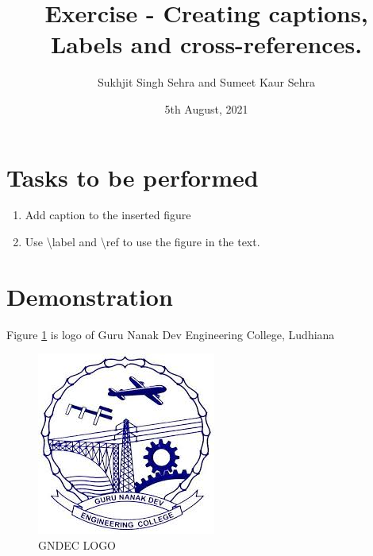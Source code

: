 \documentclass{article}
\title{Exercise - Creating captions, Labels and cross-references.}
\author{Sukhjit Singh Sehra and Sumeet Kaur Sehra}
\date{5th August, 2021}
\begin{document}
	\maketitle	
	\section*{Tasks to be performed}
	\begin{enumerate}	
		\item Add caption to the inserted figure
		\item Use \textbackslash label and \textbackslash ref to use the figure in the text.
	\end{enumerate}
	\section*{Demonstration}
	 Figure \ref{fig:gnelogo} is logo of Guru Nanak Dev Engineering College, Ludhiana
\begin{figure}[h]
\centering
\includegraphics{../../images/gnelogo}
\caption{GNDEC LOGO}
\label{fig:gnelogo}
\end{figure}
\end{document}
